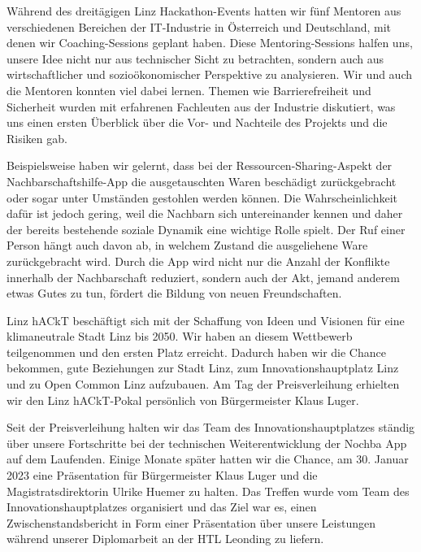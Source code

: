 Während des dreitägigen Linz Hackathon-Events hatten wir fünf Mentoren aus verschiedenen Bereichen der IT-Industrie in Österreich und Deutschland, mit denen wir Coaching-Sessions geplant haben. Diese Mentoring-Sessions halfen uns, unsere Idee nicht nur aus technischer Sicht zu betrachten, sondern auch aus wirtschaftlicher und sozioökonomischer Perspektive zu analysieren. Wir und auch die Mentoren konnten viel dabei lernen. Themen wie Barrierefreiheit und Sicherheit wurden mit erfahrenen Fachleuten aus der Industrie diskutiert, was uns einen ersten Überblick über die Vor- und Nachteile des Projekts und die Risiken gab.

Beispielsweise haben wir gelernt, dass bei der Ressourcen-Sharing-Aspekt der Nachbarschaftshilfe-App die ausgetauschten Waren beschädigt zurückgebracht oder sogar unter Umständen gestohlen werden können. Die Wahrscheinlichkeit dafür ist jedoch gering, weil die Nachbarn sich untereinander kennen und daher der bereits bestehende soziale Dynamik eine wichtige Rolle spielt. Der Ruf einer Person hängt auch davon ab, in welchem Zustand die ausgeliehene Ware zurückgebracht wird. Durch die App wird nicht nur die Anzahl der Konflikte innerhalb der Nachbarschaft reduziert, sondern auch der Akt, jemand anderem etwas Gutes zu tun, fördert die Bildung von neuen Freundschaften.

Linz hACkT beschäftigt sich mit der Schaffung von Ideen und Visionen für eine klimaneutrale Stadt Linz bis 2050. Wir haben an diesem Wettbewerb teilgenommen und den ersten Platz erreicht. Dadurch haben wir die Chance bekommen, gute Beziehungen zur Stadt Linz, zum Innovationshauptplatz Linz und zu Open Common Linz aufzubauen. Am Tag der Preisverleihung erhielten wir den Linz hACkT-Pokal persönlich von Bürgermeister Klaus Luger.

Seit der Preisverleihung halten wir das Team des Innovationshauptplatzes ständig über unsere Fortschritte bei der technischen Weiterentwicklung der Nochba App auf dem Laufenden. Einige Monate später hatten wir die Chance, am 30. Januar 2023 eine Präsentation für Bürgermeister Klaus Luger und die Magistratsdirektorin Ulrike Huemer zu halten. Das Treffen wurde vom Team des Innovationshauptplatzes organisiert und das Ziel war es, einen Zwischenstandsbericht in Form einer Präsentation über unsere Leistungen während unserer Diplomarbeit an der HTL Leonding zu liefern.

